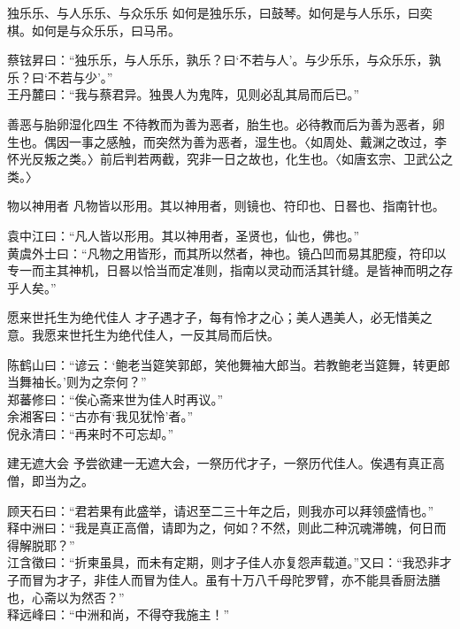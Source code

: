 \begin{yulu}{独乐乐、与人乐乐、与众乐乐}
如何是独乐乐，曰鼓琴。如何是与人乐乐，曰奕棋。如何是与众乐乐，曰马吊。
\begin{comments}
蔡铉昇曰：“独乐乐，与人乐乐，孰乐？曰‘不若与人’。与少乐乐，与众乐乐，孰乐？曰‘不若与少’。” \\
王丹麓曰：“我与蔡君异。独畏人为鬼阵，见则必乱其局而后已。”
\end{comments}
\end{yulu}

\begin{yulu}{善恶与胎卵湿化四生}
不待教而为善为恶者，胎生也。必待教而后为善为恶者，卵生也。偶因一事之感触，而突然为善为恶者，湿生也。〈如周处、戴渊之改过，李怀光反叛之类。〉前后判若两截，究非一日之故也，化生也。〈如唐玄宗、卫武公之类。〉
\begin{comments}

\end{comments}
\end{yulu}


\begin{yulu}{物以神用者}
凡物皆以形用。其以神用者，则镜也、符印也、日晷也、指南针也。
\begin{comments}
袁中江曰：“凡人皆以形用。其以神用者，圣贤也，仙也，佛也。” \\
黄虞外士曰：“凡物之用皆形，而其所以然者，神也。镜凸凹而易其肥瘦，符印以专一而主其神机，日晷以恰当而定准则，指南以灵动而活其针缝。是皆神而明之存乎人矣。”
\end{comments}
\end{yulu}

\begin{yulu}{愿来世托生为绝代佳人}
才子遇才子，每有怜才之心；美人遇美人，必无惜美之意。我愿来世托生为绝代佳人，一反其局而后快。
\begin{comments}
陈鹤山曰：“谚云：‘鲍老当筵笑郭郎，笑他舞袖大郎当。若教鲍老当筵舞，转更郎当舞袖长。’则为之奈何？” \\
郑蕃修曰：“俟心斋来世为佳人时再议。” \\
余湘客曰：“古亦有‘我见犹怜’者。” \\
倪永清曰：“再来时不可忘却。”
\end{comments}
\end{yulu}

\begin{yulu}{建无遮大会}
予尝欲建一无遮大会，一祭历代才子，一祭历代佳人。俟遇有真正高僧，即当为之。
\begin{comments}
顾天石曰：“君若果有此盛举，请迟至二三十年之后，则我亦可以拜领盛情也。” \\
释中洲曰：“我是真正高僧，请即为之，何如？不然，则此二种沉魂滞魄，何日而得解脱耶？” \\
江含徵曰：“折柬虽具，而未有定期，则才子佳人亦复怨声载道。”又曰：“我恐非才子而冒为才子，非佳人而冒为佳人。虽有十万八千母陀罗臂，亦不能具香厨法膳也，心斋以为然否？” \\
释远峰曰：“中洲和尚，不得夺我施主！”
\end{comments}
\end{yulu}

